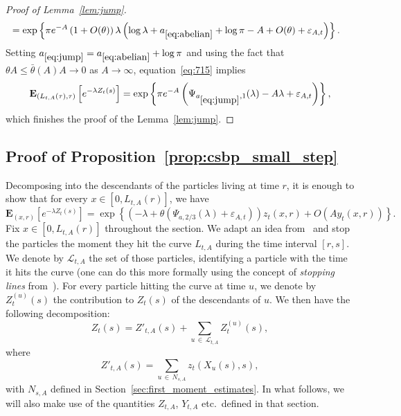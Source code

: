 \documentclass[AHL,Unicode,longabstracts,published]{cedram}
\newcommand*\eps{\varepsilon}
\newcommand*\E{\mathbf{E}}
\renewcommand{\L}{\mathcal{L}}
\newcommand{\1} {\mathds{1}}
\renewcommand*\to{\rightarrow}
\begin{document}
\begin{proof}[Proof of Lemma~\ref{lem:jump}]
\begin{multline}
\begin{aligned}
&= \exp\left\{\pi e^{-A} \left(1+O(\theta)\right)\lambda\left(\log \lambda + a_{\eqref{eq:abelian}} + \log \pi -A + O(\theta) + \eps_{A,t}\right)\right\}.
\end{aligned}
\end{multline}
Setting $a_{\eqref{eq:jump}} = a_{\eqref{eq:abelian}} + \log \pi$ and using the fact that $\theta A \le \bar\theta(A) A \to 0$ as $A\to\infty$, equation~\eqref{eq:715} implies
\begin{equation}\label{eq:716}
\E_{\left(L_{t,A}(\tau),\tau\right)}\left[e^{-\lambda Z_t(s)}\right] = \exp\left\{\pi e^{-A}\left(\Psi_{a_{\eqref{eq:jump}},1}(\lambda) -A\lambda + \eps_{A,t}\right)\right\},
\end{equation}
which finishes the proof of the Lemma~\ref{lem:jump}.
\end{proof}

\subsection{Proof of Proposition~\ref{prop:csbp_small_step}}\label{sec:csbp_small_step}

Decomposing into the descendants of the particles living at time $r$, it is enough to show that for every $x\in[0,L_{t,A}(r)]$, we have
\begin{equation}\label{eq:720}
\E_{(x,r)}\left[e^{-\lambda Z_t(s)}\right] = \exp\left\{\left(-\lambda + \theta\left(\Psi_{a,2/3}(\lambda)+\eps_{A,t}\right)\right)z_t(x,r) + O\left(Ay_t(x,r)\right)\right\}.
\end{equation}
Fix $x\in[0,L_{t,A}(r)]$ throughout the section. We adapt an idea from~\cite{bbs2} and stop the particles the moment they hit the curve $L_{t,A}$ during the time interval $[r,s]$. We denote by $\L_{t,A}$ the set of those particles, identifying a particle with the time it hits the curve (one can do this more formally using the concept of \emph{stopping lines} from~\cite{chauvin91}). For every particle hitting the curve at time $u$, we denote by $Z_t^{(u)}(s)$ the contribution to $Z_t(s)$ of the descendants of $u$. We then have the following decomposition:
\begin{equation}\label{master decomposition}
Z_t(s) = Z'_{t,A}(s)+\sum_{u\,\in\,\L_{t,A}}Z_t^{(u)}(s),
\end{equation}
where
\[
Z'_{t,A}(s) = \sum_{u\,\in\,N_{s,A}} z_t\left(X_u(s),s\right),
\]
with $N_{s,A}$ defined in Section~\ref{sec:first_moment_estimates}. In what follows, we will also make use of the quantities $Z_{t,A}$, $Y_{t,A}$ etc.~defined in that section.
\end{document}
